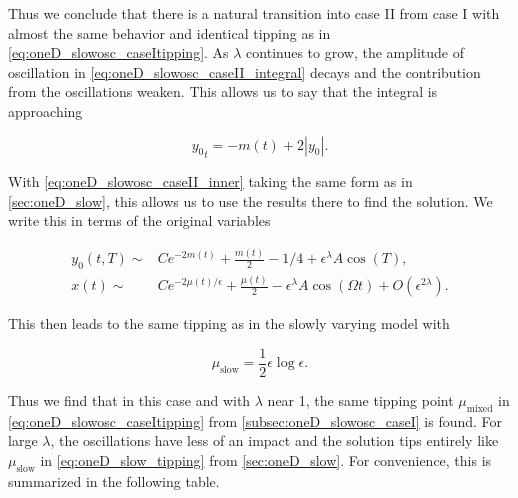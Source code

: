 \indent Thus we conclude that there is a natural transition into case II from case I with almost the same behavior and identical tipping as in \eqref{eq:oneD_slowosc_caseItipping}. As $\lambda$ continues to grow, the amplitude of oscillation in \eqref{eq:oneD_slowosc_caseII_integral} decays and the contribution from the oscillations weaken. This allows us to say that the integral is approaching

\begin{equation}\label{eq:oneD_slowosc_caseII_inner}
{y_0}_t = -m(t) +2|y_0|.
\end{equation}

With \eqref{eq:oneD_slowosc_caseII_inner} taking the same form as in \autoref{sec:oneD_slow}, this allows us to use the results there to find the solution. We write this in terms of the original variables

\begin{equation}\label{eq:oneD_slowosc_caseIIsoln}
\begin{aligned}
y_0(t,T)\sim& C e^{-2m(t)}+\frac{m(t)}{2}-1/4 +\epsilon^\lambda A\cos(T),\\
x(t)\sim& C e^{-2\mu(t)/\epsilon}+\frac{\mu(t)}{2} -\epsilon^\lambda A\cos(\Omega t)+O(\epsilon^{2\lambda}).
\end{aligned}
\end{equation}

This then leads to the same tipping as in the slowly varying model with 

\begin{equation*}
\mu_{\text{slow}}=\frac{1}{2}\epsilon\log\epsilon.
\end{equation*}

Thus we find that in this case and with $\lambda$ near 1, the same tipping point $\mu_{\text{mixed}}$ in \eqref{eq:oneD_slowosc_caseItipping} from \autoref{subsec:oneD_slowosc_caseI} is found. For large $\lambda$, the oscillations have less of an impact and the solution tips entirely like $\mu_{\text{slow}}$ in \eqref{eq:oneD_slow_tipping} from \autoref{sec:oneD_slow}. For convenience, this is summarized in the following table.

